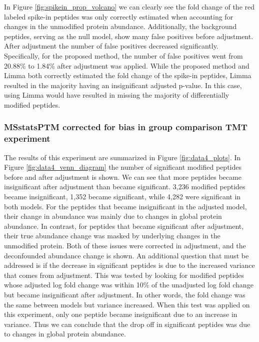 \documentclass[mcp]{article}
\numberwithin{table}{section}
\begin{document}
In Figure \ref{fig:spikein_prop_volcano} we can clearly see the fold change of the red labeled spike-in peptides was only correctly estimated when accounting for changes in the unmodified protein abundance. Additionally, the background peptides, serving as the null model, show many false positives before adjustment. After adjustment the number of false positives decreased significantly. Specifically, for the proposed method, the number of false positives went from 20.88\% to 1.84\% after adjustment was applied. While the proposed method and Limma both correctly estimated the fold change of the spike-in peptides, Limma resulted in the majority having an insignificant adjusted p-value. In this case, using Limma would have resulted in missing the majority of differentially modified peptides.

\subsubsection*{MSstatsPTM corrected for bias in group comparison TMT experiment}

The results of this experiment are summarized in Figure \ref{fig:data4_plots}. In Figure \ref{fig:data4_venn_diagram} the number of significant modified peptides before and after adjustment is shown. We can see that more peptides became insignificant after adjustment than became significant. 3,236 modified peptides became insignificant, 1,352 became significant, while 4,282 were significant in both models. For the peptides that became insignificant in the adjusted model, their change in abundance was mainly due to changes in global protein abundance. In contrast, for peptides that became significant after adjustment, their true abundance change was masked by underlying changes in the unmodified protein. Both of these issues were corrected in adjustment, and the deconfounded abundance change is shown. An additional question that must be addressed is if the decrease in significant peptides is due to the increased variance that comes from adjustment. This was tested by looking for modified peptides whose adjusted log fold change was within 10\% of the unadjusted log fold change but became insignificant after adjustment. In other words, the fold change was the same between models but variance increased. When this test was applied on this experiment, only one peptide became insignificant due to an increase in variance. Thus we can conclude that the drop off in significant peptides was due to changes in global protein abundance.
\end{document}
